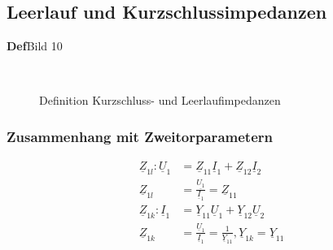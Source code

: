 \subsection{Leerlauf und Kurzschlussimpedanzen}
\textbf{Def}Bild 10\\
\begin{figure}[!h]
\centering
{}
\qquad
{}\\
\qquad
{}
\caption{Definition Kurzschluss- und Leerlaufimpedanzen}
\label{fig:zweitor:impedanzen}
\end{figure}

\subsubsection{Zusammenhang mit Zweitorparametern}
\begin{align}
	\underline{Z}_{1l}:
	\underline{U}_1&=\underline{Z}_{11}\underline{I}_1+\underline{Z}_{12}\underline{I}_2\nonumber\\
	\underline{Z}_{1l}&=\frac{\underline{U_1}}{\underline{I}_1}=\underline{Z}_{11}\nonumber\\
	\underline{Z}_{1k}:
	\underline{I}_1&=\underline{Y}_{11}\underline{U}_1+\underline{Y}_{12}\underline{U}_2\nonumber\\
	\underline{Z}_{1k}&=\frac{\underline{U}_1}{\underline{I}_1}=\frac{1}{\underline{Y}_{11}},
	\underline{Y}_{1k}=\underline{Y}_{11}\nonumber
\end{align}
